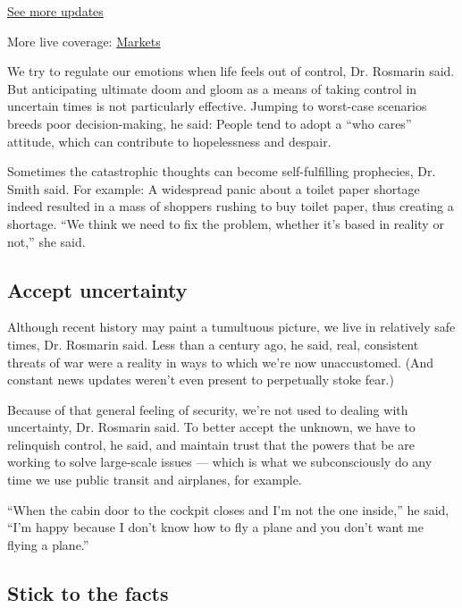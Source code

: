 \href{https://www.nytimes3xbfgragh.onion/2020/09/04/world/covid-19-coronavirus.html?action=click\&pgtype=Article\&state=default\&region=MAIN_CONTENT_1\&context=storylines_live_updates}{See
more updates}

More live coverage:
\href{https://www.nytimes3xbfgragh.onion/live/2020/09/04/business/stock-market-today-coronavirus?action=click\&pgtype=Article\&state=default\&region=MAIN_CONTENT_1\&context=storylines_live_updates}{Markets}

We try to regulate our emotions when life feels out of control, Dr.
Rosmarin said. But anticipating ultimate doom and gloom as a means of
taking control in uncertain times is not particularly effective. Jumping
to worst-case scenarios breeds poor decision-making, he said: People
tend to adopt a ``who cares'' attitude, which can contribute to
hopelessness and despair.

Sometimes the catastrophic thoughts can become self-fulfilling
prophecies, Dr. Smith said. For example: A widespread panic about a
toilet paper shortage indeed resulted in a mass of shoppers rushing to
buy toilet paper, thus creating a shortage. ``We think we need to fix
the problem, whether it's based in reality or not,'' she said.

\hypertarget{accept-uncertainty}{%
\subsection{Accept uncertainty}\label{accept-uncertainty}}

Although recent history may paint a tumultuous picture, we live in
relatively safe times, Dr. Rosmarin said. Less than a century ago, he
said, real, consistent threats of war were a reality in ways to which
we're now unaccustomed. (And constant news updates weren't even present
to perpetually stoke fear.)

Because of that general feeling of security, we're not used to dealing
with uncertainty, Dr. Rosmarin said. To better accept the unknown, we
have to relinquish control, he said, and maintain trust that the powers
that be are working to solve large-scale issues --- which is what we
subconsciously do any time we use public transit and airplanes, for
example.

``When the cabin door to the cockpit closes and I'm not the one
inside,'' he said, ``I'm happy because I don't know how to fly a plane
and you don't want me flying a plane.''

\hypertarget{stick-to-the-facts}{%
\subsection{Stick to the facts}\label{stick-to-the-facts}}

